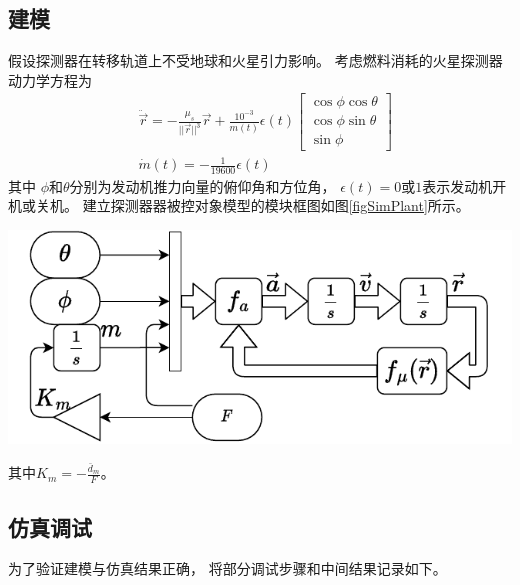 \subsection{建模}
假设探测器在转移轨道上不受地球和火星引力影响。
考虑燃料消耗的火星探测器动力学方程为
\begin{align*}
    &\ddot{\vec{r}} = -\frac{\mu_s}{||\vec{r}||^3}\vec{r}
    + \frac{10^{-3}}{m(t)}\epsilon(t)
    \left[\begin{matrix}
        \cos\phi\cos\theta \\ \cos\phi\sin\theta \\ \sin\phi
    \end{matrix}\right] \\
    &\dot{m}(t) = -\frac{1}{19600}\epsilon(t)
\end{align*}
其中
$\phi$和$\theta$分别为发动机推力向量的俯仰角和方位角，
$\epsilon(t)=0$或$1$表示发动机开机或关机。
建立探测器器被控对象模型的模块框图如图\ref{figSimPlant}所示。
\begin{center}
	\includegraphics[scale=0.8]{plant.pdf}  \\
	\label{figSimPlant}
\end{center}
其中$K_m=-\frac{\bar{d}_m}{F}$。

\subsection{仿真调试}
为了验证建模与仿真结果正确，
将部分调试步骤和中间结果记录如下。

